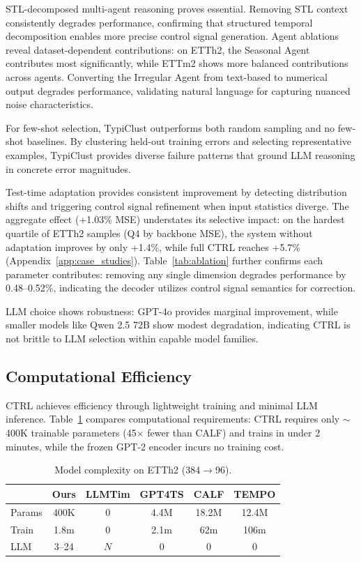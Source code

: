 STL-decomposed multi-agent reasoning proves essential. Removing STL context consistently degrades performance, confirming that structured temporal decomposition enables more precise control signal generation. Agent ablations reveal dataset-dependent contributions: on ETTh2, the Seasonal Agent contributes most significantly, while ETTm2 shows more balanced contributions across agents. Converting the Irregular Agent from text-based to numerical output degrades performance, validating natural language for capturing nuanced noise characteristics.

For few-shot selection, TypiClust outperforms both random sampling and no few-shot baselines. By clustering held-out training errors and selecting representative examples, TypiClust provides diverse failure patterns that ground LLM reasoning in concrete error magnitudes.

Test-time adaptation provides consistent improvement by detecting distribution shifts and triggering control signal refinement when input statistics diverge. The aggregate effect (+1.03\% MSE) understates its selective impact: on the hardest quartile of ETTh2 samples (Q4 by backbone MSE), the system without adaptation improves by only +1.4\%, while full CTRL reaches +5.7\% (Appendix~\ref{app:case_studies}). Table~\ref{tab:ablation} further confirms each parameter contributes: removing any single dimension degrades performance by 0.48--0.52\%, indicating the decoder utilizes control signal semantics for correction.

LLM choice shows robustness: GPT-4o provides marginal improvement, while smaller models like Qwen 2.5 72B show modest degradation, indicating CTRL is not brittle to LLM selection within capable model families.
\subsection{Computational Efficiency}
\label{sec:efficiency}

CTRL achieves efficiency through lightweight training and minimal LLM inference.
Table~\ref{tab:complexity} compares computational requirements: 
CTRL requires only $\sim$400K trainable parameters (45$\times$ fewer than CALF) 
and trains in under 2 minutes, while the frozen GPT-2 encoder incurs no training cost.

\begin{table}[h!]
\centering
\footnotesize
\setlength{\tabcolsep}{1.5pt}
\begin{tabular}{@{}lccccc@{}}
\toprule
& \textbf{Ours} & \textbf{LLMTim} & \textbf{GPT4TS} & \textbf{CALF} & \textbf{TEMPO} \\
\midrule
Params & 400K & 0 & 4.4M & 18.2M & 12.4M \\
Train & 1.8m & 0 & 2.1m & 62m & 106m \\
LLM & 3--24 & $N$ & 0 & 0 & 0 \\
\bottomrule
\end{tabular}
\caption{Model complexity on ETTh2 (384$\rightarrow$96).}
\label{tab:complexity}
\end{table}

